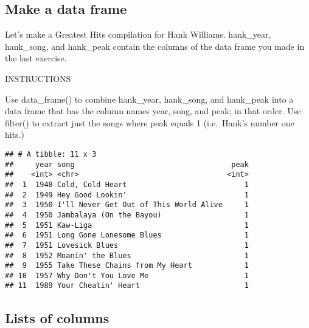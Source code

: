 \documentclass[]{article}
\newenvironment{Shaded}{\begin{snugshade}}{\end{snugshade}}
\newcommand{\KeywordTok}[1]{\textcolor[rgb]{0.13,0.29,0.53}{\textbf{#1}}}
\newcommand{\DataTypeTok}[1]{\textcolor[rgb]{0.13,0.29,0.53}{#1}}
\newcommand{\DecValTok}[1]{\textcolor[rgb]{0.00,0.00,0.81}{#1}}
\newcommand{\StringTok}[1]{\textcolor[rgb]{0.31,0.60,0.02}{#1}}
\newcommand{\CommentTok}[1]{\textcolor[rgb]{0.56,0.35,0.01}{\textit{#1}}}
\newcommand{\OperatorTok}[1]{\textcolor[rgb]{0.81,0.36,0.00}{\textbf{#1}}}
\newcommand{\NormalTok}[1]{#1}
\begin{document}
\subsection{Make a data frame}\label{make-a-data-frame}

Let's make a Greatest Hits compilation for Hank Williams. hank\_year,
hank\_song, and hank\_peak contain the columns of the data frame you
made in the last exercise.

INSTRUCTIONS

Use data\_frame() to combine hank\_year, hank\_song, and hank\_peak into
a data frame that has the column names year, song, and peak; in that
order. Use filter() to extract just the songs where peak equals 1
(i.e.~Hank's number one hits.)

\begin{Shaded}
\end{Shaded}

\begin{verbatim}
## # A tibble: 11 x 3
##     year song                                    peak
##    <int> <chr>                                  <int>
##  1  1948 Cold, Cold Heart                           1
##  2  1949 Hey Good Lookin'                           1
##  3  1950 I'll Never Get Out of This World Alive     1
##  4  1950 Jambalaya (On the Bayou)                   1
##  5  1951 Kaw-Liga                                   1
##  6  1951 Long Gone Lonesome Blues                   1
##  7  1951 Lovesick Blues                             1
##  8  1952 Moanin' the Blues                          1
##  9  1955 Take These Chains from My Heart            1
## 10  1957 Why Don't You Love Me                      1
## 11  1989 Your Cheatin' Heart                        1
\end{verbatim}

\subsection{Lists of columns}\label{lists-of-columns}
\end{document}
